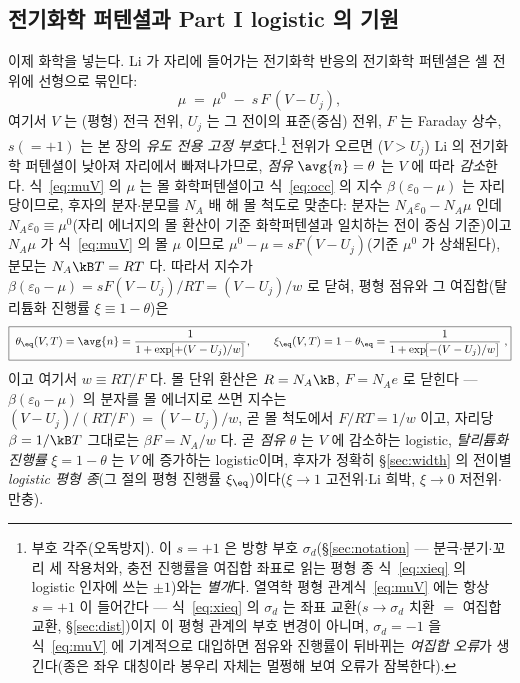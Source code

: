 \subsection{전기화학 퍼텐셜과 Part I logistic 의 기원}\label{ssec:logistic}
이제 화학을 넣는다. Li 가 자리에 들어가는 전기화학 반응의 전기화학 퍼텐셜은 셀 전위에 선형으로 묶인다:
\begin{equation}
\mu \;=\; \mu^0 \;-\; s\,F\,(V-U_j),
\label{eq:muV}
\end{equation}
여기서 $V$ 는 (평형) 전극 전위, $U_j$ 는 그 전이의 표준(중심) 전위, $F$ 는 Faraday 상수, $s(=+1)$ 는
본 장의 \emph{유도 전용 고정 부호}다.\footnote{부호 각주(오독방지). 이 $s{=}+1$ 은 방향 부호 $\sigma_d$(\S\ref{sec:notation} ---
분극$\cdot$분기$\cdot$꼬리 세 작용처와, 충전 진행률을 여집합 좌표로 읽는 평형 종 식~\eqref{eq:xieq} 의
logistic 인자에 쓰는 $\pm1$)와는 \emph{별개}다. 열역학 평형 관계식~\eqref{eq:muV} 에는 항상 $s{=}+1$ 이
들어간다 --- 식~\eqref{eq:xieq} 의 $\sigma_d$ 는 좌표 교환($s\to\sigma_d$ 치환 $=$ 여집합 교환,
\S\ref{sec:dist})이지 이 평형 관계의 부호 변경이 아니며, $\sigma_d{=}-1$ 을 식~\eqref{eq:muV} 에 기계적으로
대입하면 점유와 진행률이 뒤바뀌는 \emph{여집합 오류}가 생긴다(종은 좌우 대칭이라 봉우리 자체는 멀쩡해
보여 오류가 잠복한다).} 전위가 오르면
($V>U_j$) Li 의 전기화학 퍼텐셜이 낮아져 자리에서 빠져나가므로, \emph{점유} $\avg{n}=\theta$ 는 $V$ 에 따라
\emph{감소}한다. 식~\eqref{eq:muV} 의 $\mu$ 는 몰 화학퍼텐셜이고 식~\eqref{eq:occ} 의 지수
$\beta(\varepsilon_0-\mu)$ 는 자리당이므로, 후자의 분자$\cdot$분모를 $N_A$ 배 해 몰 척도로 맞춘다: 분자는
$N_A\varepsilon_0-N_A\mu$ 인데 $N_A\varepsilon_0\equiv\mu^0$(자리 에너지의 몰 환산이 기준 화학퍼텐셜과 일치하는
전이 중심 기준)이고 $N_A\mu$ 가 식~\eqref{eq:muV} 의 몰 $\mu$ 이므로 $\mu^0-\mu=sF(V-U_j)$(기준 $\mu^0$ 가
상쇄된다), 분모는 $N_A\kB T=RT$ 다. 따라서 지수가 $\beta(\varepsilon_0-\mu)=sF(V-U_j)/RT=(V-U_j)/w$ 로 닫혀,
평형 점유와 그 여집합(탈리튬화 진행률 $\xi\equiv1-\theta$)은
\begin{equation}
\boxed{\;\theta_\eq(V,T)=\avg{n}=\frac{1}{1+\exp\!\bigl[+(V-U_j)/w\bigr]},\qquad
\xi_\eq(V,T)=1-\theta_\eq=\frac{1}{1+\exp\!\bigl[-(V-U_j)/w\bigr]}\;,}
\label{eq:logistic}
\end{equation}
이고 여기서 $w\equiv RT/F$ 다. 몰 단위 환산은 $R=N_A\kB$, $F=N_Ae$ 로 닫힌다 --- $\beta(\varepsilon_0-\mu)$ 의
분자를 몰 에너지로 쓰면 지수는 $(V-U_j)/(RT/F)=(V-U_j)/w$, 곧 몰 척도에서 $F/RT=1/w$ 이고, 자리당
$\beta=1/\kB T$ 그대로는 $\beta F=N_A/w$ 다. 곧 \emph{점유} $\theta$ 는 $V$ 에 감소하는 logistic, \emph{탈리튬화
진행률} $\xi=1-\theta$ 는 $V$ 에 증가하는 logistic이며, 후자가 정확히 \S\ref{sec:width} 의 전이별 \emph{logistic
평형 종}(그 절의 평형 진행률 $\xi_\eq$)이다($\xi\to1$ 고전위$\cdot$Li 희박, $\xi\to0$ 저전위$\cdot$만충).

